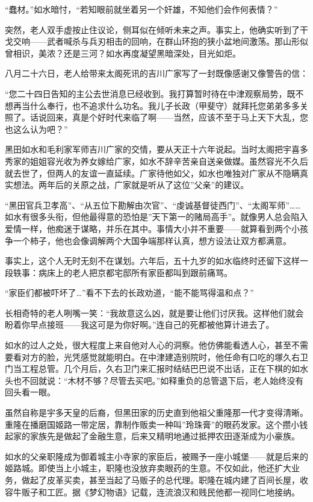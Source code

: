\documentclass[
]{article}
\begin{document}
``蠢材。''如水暗忖，``若知眼前就坐着另一个奸雄，不知他们会作何表情？''

突然，老人双手虚按止住议论，侧耳似在倾听未来之声。事实上，他确实听到了干戈交响------武者喊杀与兵刃相击的回响，在群山环抱的狭小盆地间激荡。那山形似曾相识，美浓？还是三河？如水再度凝望黑暗深处，目光如炬。

八月二十六日，老人给带来太阁死讯的吉川广家写了一封既像感谢又像警告的信：

``您二十四日告知的主公去世消息已经收到。我打算暂时待在中津观察局势，既不想再当什么奉行，也不追求什么功名。我儿子长政（甲斐守）就拜托您弟弟多多关照了。话说回来，真是个好时代来临了啊------当然，应该不至于马上天下大乱，您也这么认为吧？''

黑田如水和毛利家军师吉川广家的交情，要从天正十六年说起。当时太阁把宇喜多秀家的姐姐容光收为养女嫁给广家，如水不辞辛苦亲自送亲做媒。虽然容光不久后就去世了，但两人的友谊一直延续。广家待他如父，如水也唯独对广家从不隐瞒真实想法。两年后的关原之战，广家就是听从了这位''父亲''的建议。

``黑田官兵卫孝高''、``从五位下勘解由次官''、``虔诚基督徒西门''、``太阁军师''\ldots\ldots 如水有很多头衔，但他最得意的恐怕是''天下第一的赌局高手''。就像男人总会陷入爱情一样，他痴迷于谋略，并乐在其中。事情大小并不重要------就算看到两个小孩争一个柿子，他也会像调解两个大国争端那样认真，想方设法让双方都满意。

事实上，这个人无时无刻不在谋划。六年后，五十九岁的如水临终时还留下这样一段轶事：病床上的老人把京都宅邸所有家臣都叫到跟前痛骂。

``家臣们都被吓坏了\ldots{}''看不下去的长政劝道，``能不能骂得温和点？''

长相奇特的老人咧嘴一笑：``我故意这么凶，就是要让他们讨厌我。这样他们就会盼着你早点接班------我这可是为你好啊。''连自己的死都被他算计进去了。

如水的过人之处，很大程度上来自他对人心的洞察。他仿佛能看透人心，甚至不需要看对方的脸，光凭感觉就能明白。在中津建造别院时，他任命有口吃的塚久右卫门当工程总管。几个月后，久右卫门来汇报时结结巴巴说不出话，正在下棋的如水头也不回就说：``木材不够？尽管去买吧。''如释重负的总管退下后，老人始终没有回头看一眼。

虽然自称是宇多天皇的后裔，但黑田家的历史直到他祖父重隆那一代才变得清晰。重隆在播磨国姬路一带定居，靠制作贩卖一种叫''玲珠膏''的眼药发家。这个攒小钱起家的家族先是做起了金融生意，后来又精明地通过抵押农田逐渐成为小豪族。

如水的父亲职隆成为御着城主小寺家的家臣后，被赐予一座小城堡------就是后来的姬路城。即使当上小城主，职隆也没放弃卖眼药的生意。不仅如此，他还扩大业务，做起了皮革买卖，甚至当起了马贩子的总代理。职隆在城内建了百间长屋，收容牛贩子和工匠。据《梦幻物语》记载，连流浪汉和贱民他都一视同仁地接纳。
\end{document}
